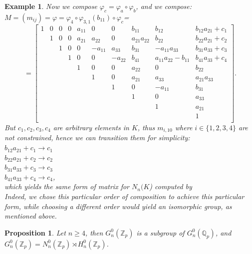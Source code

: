 \documentclass{article}
\newtheorem{proposition}[theorem]{Proposition}
\newtheorem{example}[theorem]{Example}
\begin{document}
\begin{example}
Now we compose $\varphi_c=\varphi_a\circ\varphi_b$, and we compose:\\
$M=(m_{ij})=\varphi=\varphi_4\circ\varphi_{3,1}(b_{11})\circ\varphi_c$=\[=
  \begin{bmatrix}
    1 & 0 & 0 & 0 & a_{11} & 0 & 0 & b_{11} & b_{12} & b_{12}a_{21}+c_1 \\
     & 1 & 0 & 0 & a_{21} & a_{22} & 0 & a_{21}a_{22} & b_{22} & b_{22}a_{21}+c_2 \\
    & & 1 & 0 & 0 & -a_{11} & a_{33} & b_{31} & -a_{11}a_{33} & b_{31}a_{33}+c_3 \\
    & & & 1 & 0 & 0 & -a_{22} & b_{41} & a_{11}a_{22}-b_{11} & b_{41}a_{33}+c_4 \\
    & & & & 1 & 0 & 0 & a_{22} & 0 & b_{22} \\
    & & & & & 1 & 0 & a_{21} & a_{33} & a_{21}a_{33}\\
    & & & & & & 1 & 0 & -a_{11} & b_{31} \\
    & & & & & & & 1 & 0 & a_{33} \\
    & & & & & & & & 1 & a_{21} \\
    & & & & & & & & & 1 \\
  \end{bmatrix}.
\]
But $c_1,c_2,c_3,c_4$ are arbitrary elements in $K$, thus $m_{i,10}$ where $i\in\{1,2,3,4\}$ are not constrained, hence we can transition them for simplicity:\\
$b_{12}a_{21}+c_1\rightarrow{c_1}$\\
$b_{22}a_{21}+c_2\rightarrow{c_2}$\\
$b_{31}a_{33}+c_3\rightarrow{c_3}$\\
$b_{41}a_{33}+c_4\rightarrow{c_4}$,\\
which yields the same form of matrix for $N_n(K$) computed by \cite[\S{3.3}]{BermanThesis}\\
Indeed, we chose this particular order of composition to achieve this particular form, while choosing a different order would yield an isomorphic group, as mentioned above.
\end{example}
\begin{proposition}
Let $n\geq{4}$, then $G_n^0(\mathbb{Z}_p)$ is a subgroup of $G_n^0(\mathbb{Q}_p)$, and $G_n^0(\mathbb{Z}_p)=N_n^0(\mathbb{Z}_p)\rtimes{H}_n^0(\mathbb{Z}_p)$.
\end{proposition}
\end{document}
